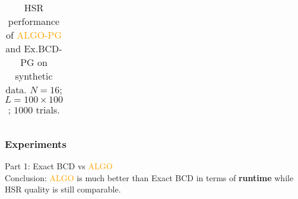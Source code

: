 \documentclass[10pt,mathserif]{beamer}
\begin{document}
\begin{frame}
\begin{table}[h]
\begin{adjustbox}{max width=\textwidth}
\begin{tabular}{|c|l|c|c|c|c|c|}
        \end{tabular}                                                                                                                                                  
        \end{adjustbox}                                                                                                                                                
        \caption{HSR performance of \textcolor{orange}{ALGO-PG} and Ex.BCD-PG on synthetic data.                                                                                        
                 $N = 16$; $L = 100 \times 100$; $1000$ trials.}                                                                                            
        \label{table:results_full_PG_MO16}
        \end{table}
    \end{frame}
    \begin{frame}
        \frametitle{Experiments}
        Part 1: Exact BCD vs \textcolor{orange}{ALGO} \\
        Conclusion: \textcolor{orange}{ALGO} is much better than Exact BCD in
                    terms of \textbf{runtime} while HSR quality is still
                    comparable. \\ 
    \end{frame}
\end{document}
